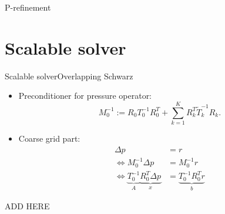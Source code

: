 \documentclass[usenames,dvipsnames,svgnames,9pt]{beamer}
\begin{document}
\begin{frame}{P-refinement}




\end{frame}


\section{Scalable solver}

\begin{frame}{Scalable solver}{Overlapping Schwarz}

\begin{itemize}
\item Preconditioner for pressure operator: 
\begin{equation*}
M_0^{-1} := R_0 T_0^{-1} R_0^T + \sum_{k=1}^{K} R_k^T \tilde{T}_k^{-1} R_k.
\end{equation*}

\item Coarse grid part:
\begin{align*}
\Delta p & = r \\
\Leftrightarrow M_0^{-1} \Delta p & = M_0^{-1}r \\
\Leftrightarrow \underbrace{T_0^{-1}}_{A} \underbrace{R_0^T \Delta p}_{x} & = \underbrace{T_0^{-1} R_0^T r}_{b}
\end{align*}
\end{itemize}
ADD HERE

\end{frame}
\end{document}
